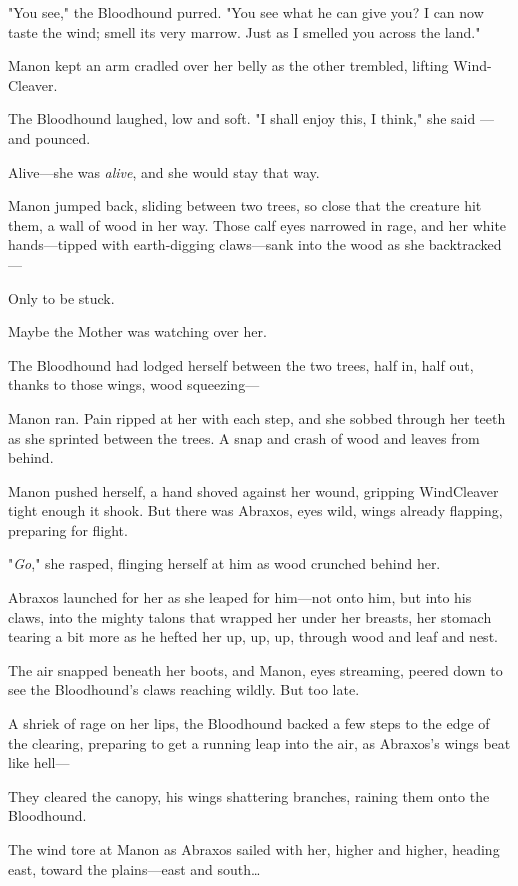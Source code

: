"You see," the Bloodhound purred.
"You see what he can give you?
I can now taste the wind; smell its very marrow.
Just as I smelled you across the land."

Manon kept an arm cradled over her belly as the other trembled, lifting Wind-Cleaver.

The Bloodhound laughed, low and soft.
"I shall enjoy this, I think," she said ---and pounced.

Alive---she was \emph{alive}, and she would stay that way.

Manon jumped back, sliding between two trees, so close that the creature hit them, a wall of wood in her way.
Those calf eyes narrowed in rage, and her white hands---tipped with earth-digging claws---sank into the wood as she backtracked---

Only to be stuck.

Maybe the Mother was watching over her.

The Bloodhound had lodged herself between the two trees, half in, half out, thanks to those wings, wood squeezing---

Manon ran.
Pain ripped at her with each step, and she sobbed through her teeth as she sprinted between the trees.
A snap and crash of wood and leaves from behind.

Manon pushed herself, a hand shoved against her wound, gripping WindCleaver tight enough it shook.
But there was Abraxos, eyes wild, wings already flapping, preparing for flight.

"\emph{Go}," she rasped, flinging herself at him as wood crunched behind her.

Abraxos launched for her as she leaped for him---not onto him, but into his claws, into the mighty talons that wrapped her under her breasts, her stomach tearing a bit more as he hefted her up, up, up, through wood and leaf and nest.

The air snapped beneath her boots, and Manon, eyes streaming, peered down to see the Bloodhound's claws reaching wildly.
But too late.

A shriek of rage on her lips, the Bloodhound backed a few steps to the edge of the clearing, preparing to get a running leap into the air, as Abraxos's wings beat like hell---

They cleared the canopy, his wings shattering branches, raining them onto the Bloodhound.

The wind tore at Manon as Abraxos sailed with her, higher and higher, heading east, toward the plains---east and south\ldots{}

